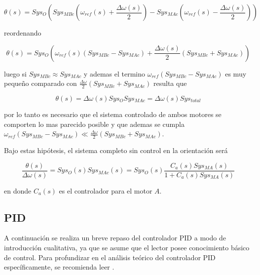 \documentclass[10pt,conference,a4paper,onecolumn]{article}%
\begin{document}
\begin{equation}
\theta(s)=Sys_O\left(Sys_{MBc}(\omega_{ref}(s)+\frac{\Delta \omega(s)}{2}) - Sys_{MAc} (\omega_{ref}(s)-\frac{\Delta \omega(s)}{2}) \right)
\end{equation}

reordenando

\begin{equation}
\theta(s)=Sys_O\left(\omega_{ref}(s) (Sys_{MBc}-Sys_{MAc})+  \frac{\Delta \omega(s)}{2}( Sys_{MBc}+Sys_{MAc})  \right)
\end{equation}

luego si $Sys_{MBc} \approx Sys_{MAc}$ y ademas el termino $\omega_{ref} (Sys_{MBc}-Sys_{MAc})$ es muy pequeño comparado con $ \frac{\Delta \omega}{2}( Sys_{MBc}+Sys_{MAc}) $ resulta que

\begin{equation}
\theta(s)=\Delta \omega(s) Sys_OSys_{MAc}= \Delta \omega(s) Sys_{total}
\end{equation}

por lo tanto es necesario que el sistema controlado de ambos motores se comporten lo mas parecido posible y que ademas se cumpla $\omega_{ref} (Sys_{MBc}-Sys_{MAc}) \ll  \frac{\Delta \omega}{2}( Sys_{MBc}+Sys_{MAc}) $.

Bajo estas hipótesis, el sistema completo sin control en la orientación será

\begin{equation}
\frac{\theta(s)}{\Delta \omega (s)}=Sys_O(s)Sys_{MAc}(s)=Sys_O(s)\frac{C_a(s)Sys_{MA}(s)}{1+C_a(s)Sys_{MA}(s)}
\label{eq:sys_tot_LA}
\end{equation}

%

en donde $C_a(s)$ es el controlador para el motor $A$.
\subsection{PID}


A continuación se realiza un breve repaso del controlador PID a modo de introducción cualitativa, ya que se asume que el lector posee conocimiento básico de control. Para profundizar en el análisis teórico del controlador PID específicamente, se recomienda leer \cite{biblia_PID}.
\end{document}
